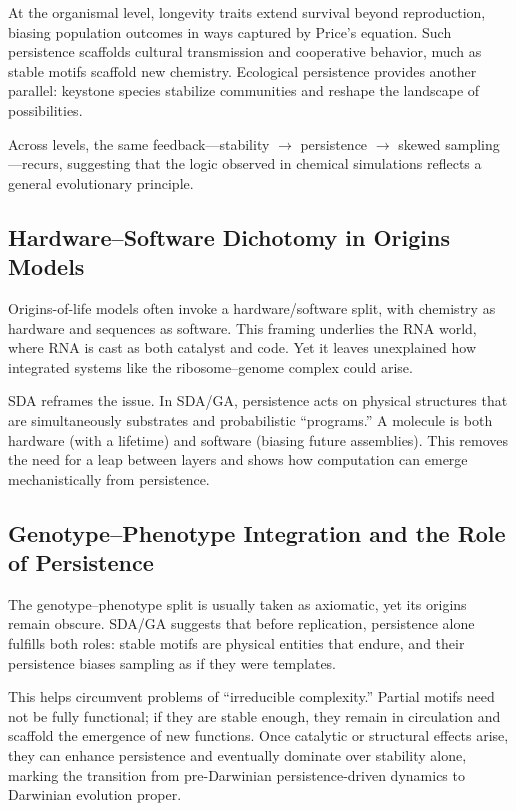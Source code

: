 \documentclass[life,article,submit,pdftex,moreauthors]{Definitions/mdpi}
\begin{document}
At the organismal level, longevity traits extend survival beyond reproduction, biasing population outcomes in ways captured by Price’s equation. 
Such persistence scaffolds cultural transmission and cooperative behavior, much as stable motifs scaffold new chemistry. 
Ecological persistence provides another parallel: keystone species stabilize communities and reshape the landscape of possibilities.  

Across levels, the same feedback—stability $\to$ persistence $\to$ skewed sampling—recurs, suggesting that the logic observed in chemical simulations reflects a general evolutionary principle.  

\subsection{Hardware–Software Dichotomy in Origins Models}
Origins-of-life models often invoke a hardware/software split, with chemistry as hardware and sequences as software. 
This framing underlies the RNA world, where RNA is cast as both catalyst and code. 
Yet it leaves unexplained how integrated systems like the ribosome–genome complex could arise.  

SDA reframes the issue. In SDA/GA, persistence acts on physical structures that are simultaneously substrates and probabilistic “programs.” 
A molecule is both hardware (with a lifetime) and software (biasing future assemblies). 
This removes the need for a leap between layers and shows how computation can emerge mechanistically from persistence.  

\subsection{Genotype–Phenotype Integration and the Role of Persistence}
The genotype–phenotype split is usually taken as axiomatic, yet its origins remain obscure. 
SDA/GA suggests that before replication, persistence alone fulfills both roles: stable motifs are physical entities that endure, and their persistence biases sampling as if they were templates.  

This helps circumvent problems of “irreducible complexity.” 
Partial motifs need not be fully functional; if they are stable enough, they remain in circulation and scaffold the emergence of new functions. 
Once catalytic or structural effects arise, they can enhance persistence and eventually dominate over stability alone, marking the transition from pre-Darwinian persistence-driven dynamics to Darwinian evolution proper.  
\end{document}
